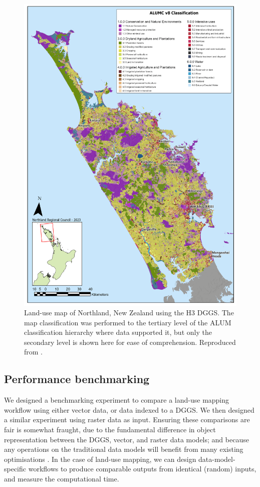 \documentclass[]{interact}
\theoremstyle{plain}%
\theoremstyle{definition}
\theoremstyle{remark}
\begin{document}
\begin{figure}[t]
    \centering
    \includegraphics[width=1\linewidth]{images/NRC_ALUM.png}
    \caption{Land-use map of Northland, New Zealand using the H3 \ac{DGGS}. The map classification was performed to the tertiary level of the \ac{ALUM} classification hierarchy where data supported it, but only the secondary level is shown here for ease of comprehension. Reproduced from \citet{law2023}.}
    \label{fig:NRC-ALUM}
\end{figure}

\subsection{Performance benchmarking}

We designed a benchmarking experiment to compare a land-use mapping workflow using either vector data, or data indexed to a \ac{DGGS}. We then designed a similar experiment using raster data as input. Ensuring these comparisons are fair is somewhat fraught, due to the fundamental difference in object representation between the DGGS, vector, and raster data models; and because any operations on the traditional data models will benefit from many existing optimisations \citep{hojati2022giscience}. In the case of land-use mapping, we can design data-model-specific workflows to produce comparable outputs from identical (random) inputs, and measure the computational time.
\end{document}
